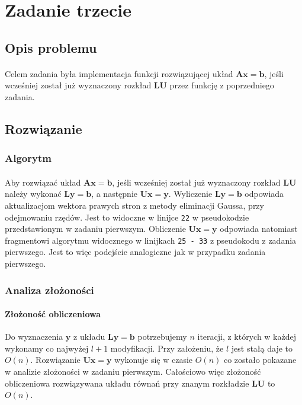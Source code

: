 \documentclass[a4paper]{article}
\begin{document}
\section{Zadanie trzecie}

\subsection{Opis problemu}
\paragraph{}
Celem zadania była implementacja funkcji rozwiązującej układ $\mathbf{Ax = b}$, jeśli wcześniej został już wyznaczony rozkład $\mathbf{LU}$ przez funkcję z poprzedniego zadania.
\subsection{Rozwiązanie}
\subsubsection{Algorytm}
\paragraph{}
Aby rozwiązać układ $\mathbf{Ax = b}$, jeśli wcześniej został już wyznaczony rozkład $\mathbf{LU}$ należy wykonać $\mathbf{Ly = b}$, a następnie $\mathbf{Ux = y}$. Wyliczenie $\mathbf{Ly = b}$ odpowiada aktualizacjom wektora prawych stron z metody eliminacji Gaussa, przy odejmowaniu rzędów. Jest to widoczne w linijce \texttt{22} w pseudokodzie przedstawionym w zadaniu pierwszym. Obliczenie $\mathbf{Ux = y}$ odpowiada natomiast fragmentowi algorytmu widocznego w linijkach \texttt{25 - 33} z pseudokodu z zadania pierwszego. Jest to więc podejście analogiczne jak w przypadku zadania pierwszego.

\subsubsection{Analiza złożoności}
\paragraph{Złożoność obliczeniowa}
Do wyznaczenia $\mathbf{y}$ z układu $\mathbf{Ly = b}$ potrzebujemy $n$ iteracji, z których w każdej wykonamy co najwyżej $l + 1$ modyfikacji. Przy założeniu, że $l$ jest stałą daje to $O(n)$. Rozwiązanie $\mathbf{Ux = y}$ wykonuje się w czasie $O(n)$ co zostało pokazane w analizie złożoności w zadaniu pierwszym. Całościowo więc złożoność obliczeniowa rozwiązywana układu równań przy znanym rozkładzie $\mathbf{LU}$ to $O(n)$.
\end{document}
